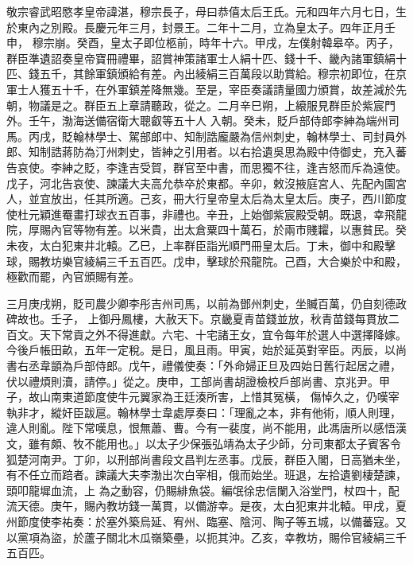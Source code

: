 
\begin{pinyinscope}

 敬宗睿武昭愍孝皇帝諱湛，穆宗長子，母曰恭僖太后王氏。元和四年六月七日，生於東內之別殿。長慶元年三月，封景王。二年十二月，立為皇太子。四年正月壬申，
 穆宗崩。癸酉，皇太子即位柩前，時年十六。甲戌，左僕射韓皋卒。丙子，群臣準遺詔奏皇帝寶冊禮畢，詔賞神策諸軍士人絹十匹、錢十千、畿內諸軍鎮絹十匹、錢五千，其餘軍鎮頒給有差。內出綾絹三百萬段以助賞給。穆宗初即位，在京軍士人獲五十千，在外軍鎮差降無幾。至是，宰臣奏議請量國力頒賞，故差減於先朝，物議是之。群臣五上章請聽政，從之。二月辛巳朔，上縗服見群臣於紫宸門外。壬午，渤海送備宿衛大聰叡等五十人
 入朝。癸未，貶戶部侍郎李紳為端州司馬。丙戌，貶翰林學士、駕部郎中、知制誥龐嚴為信州刺史，翰林學士、司封員外郎、知制誥蔣防為汀州刺史，皆紳之引用者。以右拾遺吳思為殿中侍御史，充入蕃告哀使。李紳之貶，李逢吉受賀，群官至中書，而思獨不往，逢吉怒而斥為遠使。戊子，河北告哀使、諫議大夫高允恭卒於東都。辛卯，敕沒掖庭宮人、先配內園宮人，並宜放出，任其所適。己亥，冊大行皇帝皇太后為太皇太后。庚子，西川節度
 使杜元穎進罨畫打球衣五百事，非禮也。辛丑，上始御紫宸殿受朝。既退，幸飛龍院，厚賜內官等物有差。以米貴，出太倉粟四十萬石，於兩市賤糶，以惠貧民。癸未夜，太白犯東井北轅。乙巳，上率群臣詣光順門冊皇太后。丁未，御中和殿擊球，賜教坊樂官綾絹三千五百匹。戊申，擊球於飛龍院。己酉，大合樂於中和殿，極歡而罷，內官頒賜有差。



 三月庚戌朔，貶司農少卿李彤吉州司馬，以前為鄧州刺史，坐贓百萬，仍自刻德政碑故也。壬子，
 上御丹鳳樓，大赦天下。京畿夏青苗錢並放，秋青苗錢每貫放二百文。天下常貢之外不得進獻。六宅、十宅諸王女，宜令每年於選人中選擇降嫁。今後戶帳田畝，五年一定稅。是日，風且雨。甲寅，始於延英對宰臣。丙辰，以尚書右丞韋顗為戶部侍郎。戊午，禮儀使奏：「外命婦正旦及四始日舊行起居之禮，伏以禮煩則瀆，請停。」從之。庚申，工部尚書胡證檢校戶部尚書、京兆尹。甲子，故山南東道節度使牛元翼家為王廷湊所害，上惜其冤橫，
 傷悼久之，仍嘆宰執非才，縱奸臣跋扈。翰林學士韋處厚奏曰：「理亂之本，非有他術，順人則理，違人則亂。陛下常嘆息，恨無蕭、曹。今有一裴度，尚不能用，此馮唐所以感悟漢文，雖有頗、牧不能用也。」以太子少保張弘靖為太子少師，分司東都太子賓客令狐楚河南尹。丁卯，以刑部尚書段文昌判左丞事。戊辰，群臣入閣，日高猶未坐，有不任立而踣者。諫議大夫李渤出次白宰相，俄而始坐。班退，左拾遺劉棲楚諫，頭叩龍墀血流，上
 為之動容，仍賜緋魚袋。編氓徐忠信闌入浴堂門，杖四十，配流天德。庚午，賜內教坊錢一萬貫，以備游幸。是夜，太白犯東井北轅。甲戌，夏州節度使李祐奏：於塞外築烏延、宥州、臨塞、陰河、陶子等五城，以備蕃寇。又以黨項為盜，於蘆子關北木瓜嶺築壘，以扼其沖。乙亥，幸教坊，賜伶官綾絹三千五百匹。




\end{pinyinscope}
